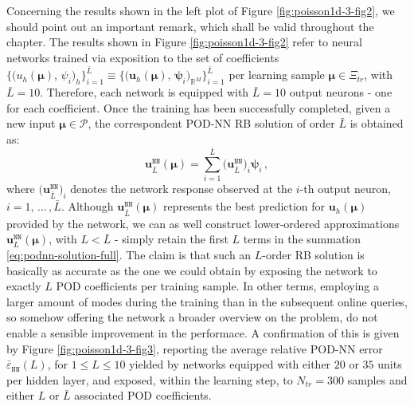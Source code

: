 \documentclass[12pt, a4paper, twoside, openright]{report}
\numberwithin{equation}{chapter}
\theoremstyle{theorem}
\theoremstyle{definition}
\theoremstyle{remark}
\theoremstyle{proposition}
\numberwithin{figure}{chapter}
\newcommand{\bg}[1]{\boldsymbol{#1}}
\begin{document}
		Concerning the results shown in the left plot of Figure \ref{fig:poisson1d-3-fig2}, we should point out an important remark, which shall be valid throughout the chapter. The results shown in Figure \ref{fig:poisson1d-3-fig2} refer to neural networks trained via exposition to the set of coefficients $\big\lbrace \big( u_h(\bg{\mu}), \, \psi_i \big)_h \big\rbrace_{i = 1}^{\scriptscriptstyle{\bar{L}}} \equiv \big\lbrace \big( \mathbf{u}_h(\bg{\mu}), \, \bg{\psi}_i \big)_{\mathbb{R}^M} \big\rbrace_{i = 1}^{\scriptscriptstyle{\bar{L}}}$ per learning sample $\bg{\mu} \in \Xi_{tr}$, with $\bar{L} = 10$. Therefore, each network is equipped with $\bar{L} = 10$ output neurons - one for each coefficient. Once the training has been successfully completed, given a new input $\bg{\mu} \in \mathcal{P}$, the correspondent POD-NN RB solution of order $\bar{L}$ is obtained as:
		\begin{equation}
			\label{eq:podnn-solution-full}
			\mathbf{u}_{\bar{L}}^{\texttt{NN}}(\bg{\mu}) = \sum_{i = 1}^{\bar{L}} \big( \mathbf{u}_{\bar{L}}^{\texttt{NN}} \big)_i \bg{\psi}_i \, ,
		\end{equation} 
		where $\big( \mathbf{u}_{\bar{L}}^{\texttt{NN}} \big)_i$ denotes the network response observed at the $i$-th output neuron, $i = 1, \, \ldots \, , \bar{L}$. Although $\mathbf{u}_{\bar{L}}^{\texttt{NN}}(\bg{\mu})$ represents the best prediction for $\mathbf{u}_h(\bg{\mu})$ provided by the network, we can as well construct lower-ordered approximations $\mathbf{u}_L^{\texttt{NN}}(\bg{\mu})$, with $L < \bar{L}$ - simply retain the first $L$ terms in the summation \eqref{eq:podnn-solution-full}. The claim is that such an $L$-order RB solution is basically as accurate as the one we could obtain by exposing the network to exactly $L$ POD coefficients per training sample. In other terms, employing a larger amount of modes during the training than in the subsequent online queries, so somehow offering the network a broader overview on the problem, do not enable a sensible improvement in the performace. A confirmation of this is given by Figure \ref{fig:poisson1d-3-fig3}, reporting the average relative POD-NN error $\bar{\varepsilon}_{\texttt{NN}}^{}(L)$, for $1 \leq L \leq 10$ yielded by networks equipped with either $20$ or $35$ units per hidden layer, and exposed, within the learning step, to $N_{tr} = 300$ samples and either $L$ or $\bar{L}$ associated POD coefficients.
		
\end{document}
